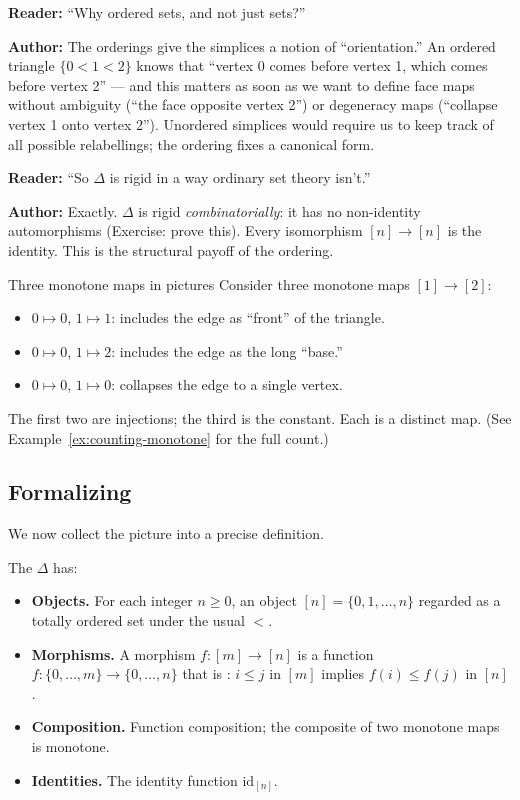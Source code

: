 \begin{dialog}
\textbf{Reader:} ``Why ordered sets, and not just sets?''

\textbf{Author:} The orderings give the simplices a notion of
``orientation.'' An ordered triangle $\{0 < 1 < 2\}$ knows that
``vertex 0 comes before vertex 1, which comes before vertex 2'' — and
this matters as soon as we want to define face maps without ambiguity
(``the face opposite vertex 2'') or degeneracy maps
(``collapse vertex 1 onto vertex 2''). Unordered simplices would
require us to keep track of all possible relabellings; the ordering
fixes a canonical form.

\textbf{Reader:} ``So $\Delta$ is rigid in a way ordinary set theory isn't.''

\textbf{Author:} Exactly. $\Delta$ is rigid \emph{combinatorially}: it
has no non-identity automorphisms (Exercise: prove this). Every
isomorphism $[n] \to [n]$ is the identity. This is the structural
payoff of the ordering.
\end{dialog}

\begin{example}{Three monotone maps in pictures}
Consider three monotone maps $[1] \to [2]$:
\begin{itemize}
  \item $0 \mapsto 0$, $1 \mapsto 1$: includes the edge as ``front'' of the triangle.
  \item $0 \mapsto 0$, $1 \mapsto 2$: includes the edge as the long ``base.''
  \item $0 \mapsto 0$, $1 \mapsto 0$: collapses the edge to a single vertex.
\end{itemize}
The first two are injections; the third is the constant. Each is a
distinct map. (See Example~\ref{ex:counting-monotone} for the full count.)
\end{example}

\subsection{Formalizing}

We now collect the picture into a precise definition.

\begin{definition}
\label{def:simplex-category}
The  $\Delta$ has:
\begin{itemize}
  \item \textbf{Objects.} For each integer $n \geq 0$, an object $[n] =
        \{0, 1, \ldots, n\}$ regarded as a totally ordered set under the
        usual $<$.
  \item \textbf{Morphisms.} A morphism $f : [m] \to [n]$ is a function
        $f : \{0, \ldots, m\} \to \{0, \ldots, n\}$ that is :
        $i \leq j$ in $[m]$ implies $f(i) \leq f(j)$ in $[n]$.
  \item \textbf{Composition.} Function composition; the composite of two
        monotone maps is monotone.
  \item \textbf{Identities.} The identity function $\mathrm{id}_{[n]}$.
\end{itemize}
\end{definition}

